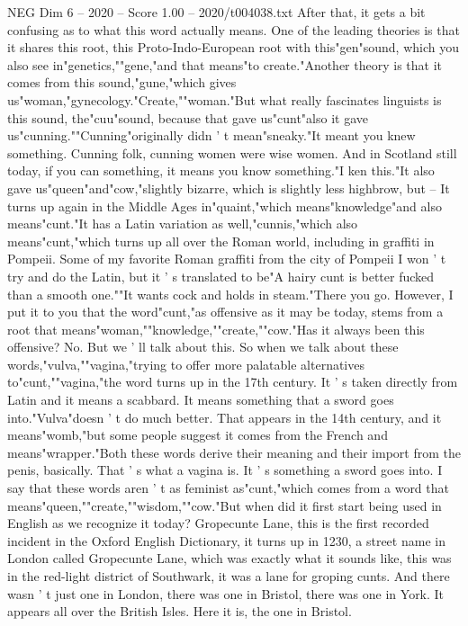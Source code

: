 \begin{textsample}{NEG Dim 6 – 2020 – Score 1.00 – 2020/t004038.txt}
After that, it gets a bit confusing as to what this word actually means.
One of the leading theories is that it shares this root, this Proto-Indo-European root with this"gen"sound, which you also see in"genetics,""gene,"and that means"to create."Another theory is that it comes from this sound,"gune,"which gives us"woman,"gynecology."Create,""woman."But what really fascinates linguists is this sound, the"cuu"sound, because that gave us"cunt"also it gave us"cunning.""Cunning"originally didn ' t mean"sneaky."It meant you knew something.
Cunning folk, cunning women were wise women.
And in Scotland still today, if you can something, it means you know something."I ken this."It also gave us"queen"and"cow,"slightly bizarre, which is slightly less highbrow, but -- It turns up again in the Middle Ages in"quaint,"which means"knowledge"and also means"cunt."It has a Latin variation as well,"cunnis,"which also means"cunt,"which turns up all over the Roman world, including in graffiti in Pompeii.
Some of my favorite Roman graffiti from the city of Pompeii I won ' t try and do the Latin, but it ' s translated to be"A hairy cunt is better fucked than a smooth one.""It wants cock and holds in steam."There you go.
However, I put it to you that the word"cunt,"as offensive as it may be today, stems from a root that means"woman,""knowledge,""create,""cow."Has it always been this offensive?
No.
But we ' ll talk about this.
So when we talk about these words,"vulva,""vagina,"trying to offer more palatable alternatives to"cunt,""vagina,"the word turns up in the 17th century.
It ' s taken directly from Latin and it means a scabbard.
It means something that a sword goes into."Vulva"doesn ' t do much better.
That appears in the 14th century, and it means"womb,"but some people suggest it comes from the French and means"wrapper."Both these words derive their meaning and their import from the penis, basically.
That ' s what a vagina is.
It ' s something a sword goes into.
I say that these words aren ' t as feminist as"cunt,"which comes from a word that means"queen,""create,""wisdom,""cow."But when did it first start being used in English as we recognize it today?
Gropecunte Lane, this is the first recorded incident in the Oxford English Dictionary, it turns up in 1230, a street name in London called Gropecunte Lane, which was exactly what it sounds like, this was in the red-light district of Southwark, it was a lane for groping cunts.
And there wasn ' t just one in London, there was one in Bristol, there was one in York.
It appears all over the British Isles.
Here it is, the one in Bristol.

\end{textsample}
